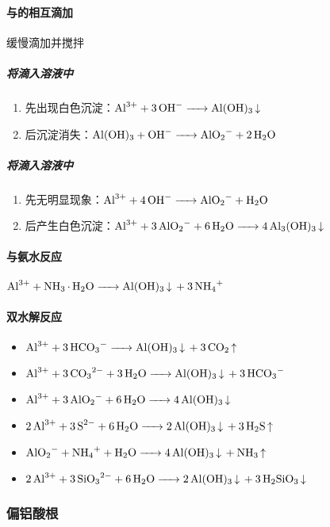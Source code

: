 \documentclass[a4paper]{article}
\begin{document}
	\paragraph{与的相互滴加}
	缓慢滴加并搅拌
	\subparagraph{将滴入溶液中}
	\begin{enumerate}
		\item 先出现白色沉淀：$\ce{Al^3+ + 3OH- -> Al(OH)3 v}\\$
		\item 后沉淀消失：$\ce{Al(OH)3 + OH- -> AlO2- + 2H2O}\\$
	\end{enumerate}
	\subparagraph{将滴入溶液中}
	\begin{enumerate}
		\item 先无明显现象：$\ce{Al^3+ + 4OH- -> AlO2- + H2O}\\$
		\item 后产生白色沉淀：$\ce{Al^3+ + 3AlO2- + 6H2O -> 4Al3(OH)3 v}\\$
	\end{enumerate}
	\paragraph{与氨水反应}
	$\ce{Al^3+ + NH3*H2O -> Al(OH)3 v + 3NH4+}\\$
	\paragraph{双水解反应}
	\begin{itemize}
		\item $\ce{Al^3+ + 3HCO3- -> Al(OH)3 v + 3CO2 ^}$
		\item $\ce{Al^3+ + 3CO3^2- + 3H2O -> Al(OH)3 v + 3HCO3-}$
		\item $\ce{Al^3+ + 3AlO2- + 6H2O -> 4Al(OH)3 v}$
		\item $\ce{2Al^3+ + 3S^2- + 6H2O -> 2Al(OH)3 v + 3H2S ^}$
		\item $\ce{AlO2- + NH4+ + H2O -> 4Al(OH)3 v + NH3 ^}$
		\item $\ce{2Al^3+ + 3SiO3^2- + 6H2O -> 2Al(OH)3 v + 3H2SiO3 v}$
	\end{itemize}
	

	\subsubsection{偏铝酸根}
\end{document}
